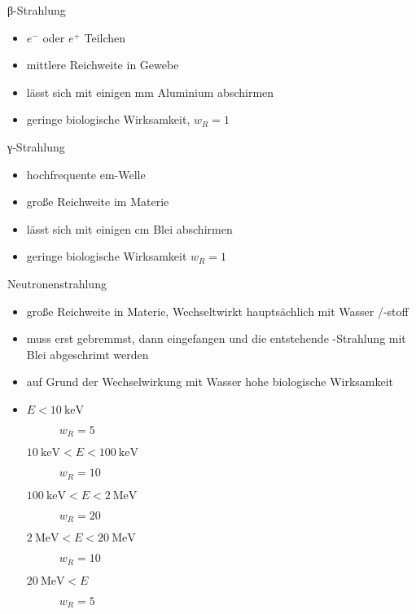 \begin{frame}{β-Strahlung}
\begin{itemize}
	\item $e^-$ oder $e^+$ Teilchen
	\item mittlere Reichweite in Gewebe
	\item lässt sich mit einigen \si{\milli \meter} Aluminium abschirmen
	\item geringe biologische Wirksamkeit, $w_R=1$
\end{itemize}
\end{frame}
\begin{frame}{γ-Strahlung}
	\begin{itemize}
		\item hochfrequente em-Welle
		\item große Reichweite im Materie
		\item lässt sich mit einigen \si{\centi \meter} Blei abschirmen
		\item geringe biologische Wirksamkeit $w_R=1$
	\end{itemize}
\end{frame}
\begin{frame}{Neutronenstrahlung}
\begin{itemize}
	\item große Reichweite in Materie, Wechseltwirkt hauptsächlich mit Wasser /-stoff
	\item muss erst gebremmst, dann eingefangen und die entstehende \gamma-Strahlung mit Blei abgeschrimt werden
	\item auf Grund der Wechselwirkung mit Wasser hohe biologische Wirksamkeit
	\item \begin{description}
		\item[$E<\SI{10}{\kilo \electronvolt}$] $w_R=5$
		\item[$\SI{10}{\kilo \electronvolt}<E<\SI{100}{\kilo \electronvolt}$] $w_R=10$
		\item[$\SI{100}{\kilo \electronvolt}<E<\SI{2}{\mega \electronvolt}$] $w_R=20$
		\item[$\SI{2}{\mega \electronvolt}<E<\SI{20}{\mega \electronvolt}$] $w_R=10$
		\item[$\SI{20}{\mega \electronvolt}<E$] $w_R=5$
	\end{description}\cite{straschuver}
\end{itemize}
\end{frame}
\nocite{BfS}
